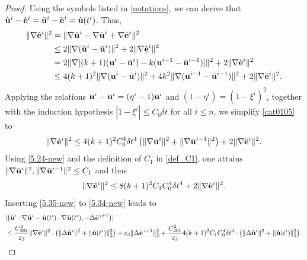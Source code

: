 \documentclass{article}
\theoremstyle{definition}                   %
\begin{document}
\begin{proof}
Using the symbols listed in \eqref{notations}, 
we can derive that $\hat{\bf u}^i - \hat{\bf e}^i = \tilde{\bf u}^i - \tilde{\bf e}^i = \hat{\bf u}(t^i)$.
Thus, 
\begin{align}
\|\nabla \hat{\bf e}^{i}\|^2
&=
\|\nabla \hat{\bf u}^{i}
- \nabla \tilde{\bf u}^{i}
+ \nabla \tilde{\bf e}^{i}\|^2 \notag\\
&\le 
2 \| \nabla (\hat{\bf u}^i - \tilde{\bf u}^i) \|^2
+ 2 \|\nabla \tilde{\bf e}^i \|^2
\notag\\
&= 2 \| \nabla 
      [(k+1) ({\bf u}^i     - \bar{\bf u}^i) 
         -k  ({\bf u}^{i-1} - \bar{\bf u}^{i-1}) 
      ]   \|^2
+ 2 \|\nabla \tilde{\bf e}^i \|^2
\notag\\
&\le 
4 (k+1)^2 
\| \nabla  ({\bf u}^i - \bar{\bf u}^i)\|^2 
+4k^2 \| \nabla ({\bf u}^{i-1} - \bar{\bf u}^{i-1}) 
   \|^2
+ 2 \|\nabla \tilde{\bf e}^i \|^2.
\label{cat0105}
\end{align}
Applying the relations ${\bf u}^i - \bar{\bf u}^i = (\eta^i-1) \bar{\bf u}^i$ and $(1-\eta^i) = (1-\xi^i)^2$, together with the induction hypothesis $|1-\xi^i| \le C_0 \delta t$ for all $i\le n$, we simplify \eqref{cat0105} to
\begin{align}
\|\nabla \hat{\bf e}^{i}\|^2
\le 
4 (k+1)^2 C_0^4 \delta t^4 
\left( \| \nabla \bar{\bf u}^i\|^2 
+      \| \nabla \bar{\bf u}^{i-1} \|^2 \right) 
+ 2 \|\nabla \tilde{\bf e}^i \|^2.
\label{cat0106}
\end{align}
Using \eqref{5.24-new} and the definition of $C_1$ in \eqref{def_C1}, one attains 
$\|\nabla \bar{\bf u}^i\|^2,  \| \nabla \bar{\bf u}^{i-1} \|^2 \le C_1$ and thus
\begin{align}
\|\nabla \hat{\bf e}^{i}\|^2
\le 
8 (k+1)^2 C_1 C_0^4 \delta t^4 
+ 2 \|\nabla \tilde{\bf e}^i \|^2.
\label{5.35-new}
\end{align}
Inserting \eqref{5.35-new} to \eqref{5.34-new} leads to
\begin{align}
&|\bigl(
\hat{\bf u}^{i} \cdot \nabla \hat{\bf u}^{i}
- \hat{\bf u}(t^{i})\cdot \nabla \hat{\bf u}(t^{i}),
- \Delta \tilde{\bf e}^{\,i+1}
\bigr)| \notag \\
&\le \frac{C_{201}^2}{\varepsilon_3} 
\|\nabla \tilde{\bf e}^{i}\|^{2}
\cdot \left( \|\Delta \hat{\bf u}^{i}\|^{2}
+
\|\hat{\bf u}(t^{i})\|_2^{2}\right)
+
\varepsilon_3 \|\Delta \tilde{\bf e}^{\,i+1}\|_{2}^{2}
+ \frac{C_{201}^2}{\varepsilon_3} 4 (k+1)^2C_1 C_0^4 \delta t^4 
\cdot \left( \|\Delta \hat{\bf u}^{i}\|^{2}
+
\|\hat{\bf u}(t^{i})\|_2^{2}\right).
\label{5.36-new}
\end{align}


\end{proof}
\end{document}
